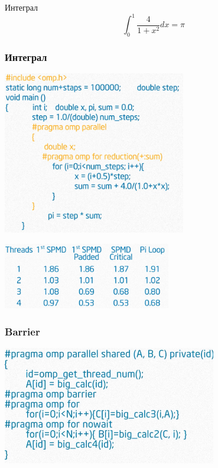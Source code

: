 \documentclass{beamer}
\begin{document}
\begin{frame}[fragile]{Интеграл}
  \begin{equation}
    \int_0^1 \frac{4}{1+x^2} dx = \pi  \nonumber
  \end{equation}
\end{frame}

\begin{frame}[plain]
  \frametitle{Интеграл}
  \centering
  \includegraphics[width=0.6\textwidth]{integral-worksharing}\pause

  \includegraphics[width=0.55\textwidth]{integral-worksharing-time}
\end{frame}


\begin{frame}
  \frametitle{Barrier}
  \centering
  \includegraphics[width=0.7\textwidth]{barrier}
\end{frame}
\end{document}

